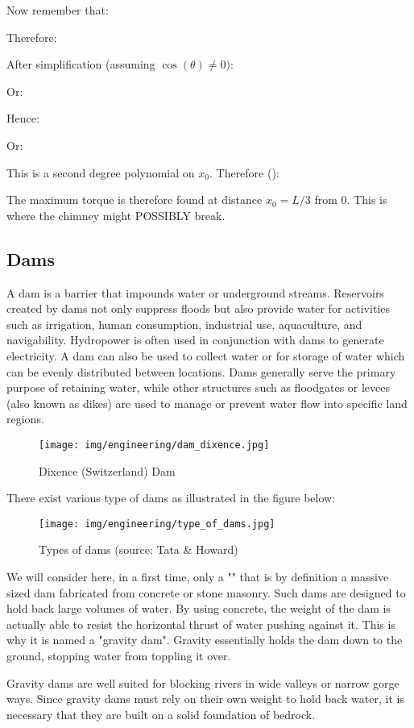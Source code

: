 	Now remember that:
	
	Therefore:
	
	After simplification (assuming $\cos(\theta)\neq 0)$:
	
	Or:
	
	Hence:
	
	Or:
	
	This is a second degree polynomial on $x_0$. Therefore ():
	
	
	The maximum torque is therefore found at distance $x_0 = L/3$
from $0$. This is where the chimney might POSSIBLY break.
	
	\pagebreak
	\subsection{Dams}
	A dam is a barrier that impounds water or underground streams. Reservoirs created by dams not only suppress floods but also provide water for activities such as irrigation, human consumption, industrial use, aquaculture, and navigability. Hydropower is often used in conjunction with dams to generate electricity. A dam can also be used to collect water or for storage of water which can be evenly distributed between locations. Dams generally serve the primary purpose of retaining water, while other structures such as floodgates or levees (also known as dikes) are used to manage or prevent water flow into specific land regions.
	\begin{figure}[H]
		\centering
		\texttt{[image: img/engineering/dam\_dixence.jpg]}
		\caption{Dixence (Switzerland) Dam}
	\end{figure}
	There exist various type of dams as illustrated in the figure below:
	\begin{figure}[H]
		\centering
		\texttt{[image: img/engineering/type\_of\_dams.jpg]}
		\caption[Types of dams]{Types of dams (source: Tata \& Howard)}
	\end{figure}
	We will consider here, in a first time, only a "" that is by definition a massive sized dam fabricated from concrete or stone masonry. Such dams are designed to hold back large volumes of water. By using concrete, the weight of the dam is actually able to resist the horizontal thrust of water pushing against it. This is why it is named a "gravity dam". Gravity essentially holds the dam down to the ground, stopping water from toppling it over.

	Gravity dams are well suited for blocking rivers in wide valleys or narrow gorge ways. Since gravity dams must rely on their own weight to hold back water, it is necessary that they are built on a solid foundation of bedrock.
	
